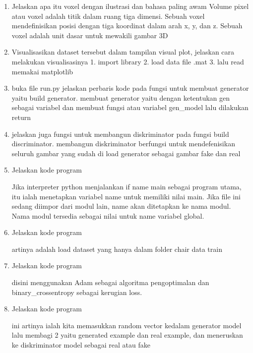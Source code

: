\begin{enumerate}
        \item Jelaskan apa itu voxel dengan ilustrasi dan bahasa paling awam
        Volume pixel atau voxel adalah titik dalam ruang tiga dimensi. Sebuah voxel mendefinisikan posisi dengan tiga koordinat dalam arah x, y, dan z. Sebuah voxel adalah unit dasar untuk mewakili gambar 3D
        
        \item Visualisasikan dataset tersebut dalam tampilan visual plot, jelaskan cara melakukan visualisasinya
        1. import library									   2. load data file .mat  								  3. lalu read memakai matplotlib
        
        \item buka file run.py jelaskan perbaris kode pada fungsi untuk membuat generator yaitu build generator.
        membuat generator yaitu dengan ketentukan gen sebagai variabel dan membuat fungsi atau variabel gen\_model lalu dilakukan return
        
        \item jelaskan juga fungsi untuk membangun diskriminator pada fungsi build discriminator.
        membangun diskriminator berfungsi untuk mendefenisikan seluruh gambar yang sudah di load generator sebagai gambar fake dan real
        
        \item Jelaskan kode program
        
        Jika interpreter python menjalankan if name main  sebagai program utama, itu ialah menetapkan variabel name  untuk memiliki nilai main. Jika file ini sedang diimpor dari modul lain, name akan ditetapkan ke nama modul. Nama modul tersedia sebagai nilai untuk name variabel global.
        
        \item Jelaskan kode program 
        
        artinya adalah load dataset yang hanya dalam folder chair data train
        
        \item Jelaskan kode program 
        
        disini menggunakan Adam sebagai algoritma pengoptimalan dan binary\_crossentropy sebagai kerugian loss. 
        
        \item Jelaskan kode program 
        
        ini artinya ialah kita memasukkan random vector kedalam generator model lalu membagi 2 yaitu generated example dan real example, dan meneruskan ke diskriminator model sebagai real atau fake
        

\end{enumerate}
